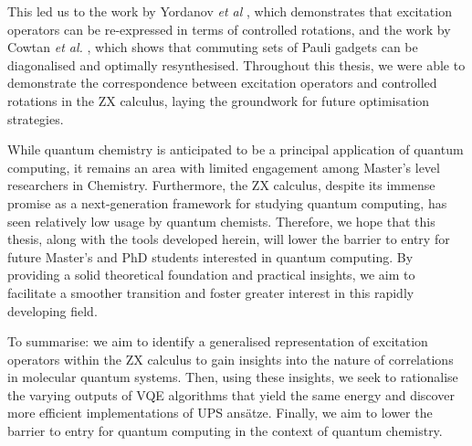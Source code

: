 This led us to the work by Yordanov \textit{et al} \cite{Yordanov2020}, which demonstrates that excitation operators can be re-expressed in terms of controlled rotations, and the work by Cowtan \textit{et al.} \cite{Cowtan2020}, which shows that commuting sets of Pauli gadgets can be diagonalised and optimally resynthesised. Throughout this thesis, we were able to demonstrate the correspondence between excitation operators and controlled rotations in the ZX calculus, laying the groundwork for future optimisation strategies.

While quantum chemistry is anticipated to be a principal application of quantum computing, it remains an area with limited engagement among Master's level researchers in Chemistry. Furthermore, the ZX calculus, despite its immense promise as a next-generation framework for studying quantum computing, has seen relatively low usage by quantum chemists. Therefore, we hope that this thesis, along with the tools developed herein, will lower the barrier to entry for future Master's and PhD students interested in quantum computing. By providing a solid theoretical foundation and practical insights, we aim to facilitate a smoother transition and foster greater interest in this rapidly developing field.

To summarise: we aim to identify a generalised representation of excitation operators within the ZX calculus to gain insights into the nature of correlations in molecular quantum systems. Then, using these insights, we seek to rationalise the varying outputs of VQE algorithms that yield the same energy and discover more efficient implementations of UPS ansätze. Finally, we aim to lower the barrier to entry for quantum computing in the context of quantum chemistry.
